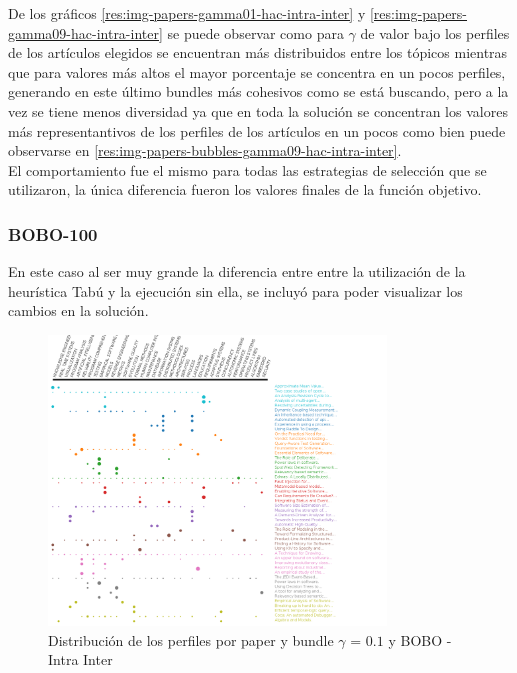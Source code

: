 De los gráficos \ref{res:img-papers-gamma01-hac-intra-inter} y \ref{res:img-papers-gamma09-hac-intra-inter} se puede observar como para $\gamma$ de valor bajo los perfiles de los artículos elegidos se encuentran más distribuidos entre los tópicos mientras que para valores más altos el mayor porcentaje se concentra en un pocos perfiles, generando en este último bundles más cohesivos como se está buscando, pero a la vez se tiene menos diversidad ya que en toda la solución se concentran los valores más representantivos de los perfiles de los artículos en un pocos como bien puede observarse en \ref{res:img-papers-bubbles-gamma09-hac-intra-inter}.\\
El comportamiento fue el mismo para todas las estrategias de selección que se utilizaron, la única diferencia fueron los valores finales de la función objetivo.
\subsubsection{BOBO-100}
En este caso al ser muy grande la diferencia entre entre la utilización de la heurística Tabú y la ejecución sin ella,  se incluyó para poder visualizar los cambios en la solución.
\begin{figure}[H]
  \centering
    \includegraphics[width=0.8\textwidth]{resultados/papers/BOBO/INTRA_INTER/gamma-01.png}
  \caption{Distribución de los perfiles por paper y bundle $\gamma$ = $0.1$ y BOBO - Intra Inter}
  \label{res:img-papers-gamma01-bobo-intra-inter}
\end{figure}

